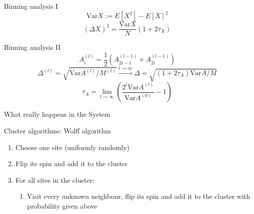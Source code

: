 \documentclass[handout]{beamer}
\begin{document}
\begin{frame}{Binning analysis I}
\pause
\[ \text{Var} X := E \left[ X^2 \right] - E \left[ X \right]^2 \]
\pause
\[ (\Delta X)^2 = \frac{\text{Var}X}{N}\left(1+2\tau_X\right) \]
\end{frame}

\begin{frame}{Binning analysis II}
\pause
\[ A_i^{(l)} = \frac{1}{2} \left( A_{2i-1}^{(l-1)} + A_{2i}^{(l-1)} \right) \]
\pause
\[ \Delta^{(l)} = \sqrt{\text{Var}A^{(l)}/M^{(l)}}  \stackrel{l \rightarrow \infty}{\rightarrow} \Delta = \sqrt{(1+2\tau_A)\text{Var}A/M} \]
\pause
\[ \tau_A = \lim_{l\rightarrow\infty}\left( \frac{2^l \text{Var} A^{(l)}}{\text{Var} A^{(0)}} - 1 \right) \]
\end{frame}

\begin{frame}{What really happens in the System}
\end{frame}

\begin{frame}{Cluster algorithms: Wolff algorithm}
\begin{enumerate}
\item<2-> Choose one site (uniformly randomly)
\item<3-> Flip its spin and add it to the cluster
\item<4-> For all sites in the cluster:
	\begin{enumerate}
	\item Visit every unknown neighbour, flip its spin and add it to the cluster with probability given above
	\end{enumerate}
\end{enumerate}
\note{ }
\end{frame}
\end{document}
